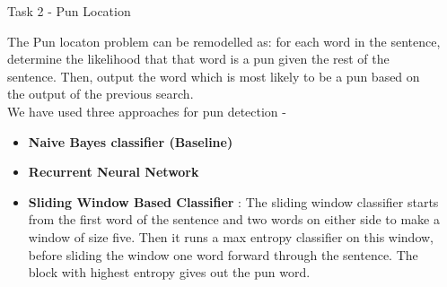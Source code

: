 \documentclass[final]{beamer}
\newlength{\onecolwid}
\newlength{\twocolwid}
\begin{document}
\begin{frame}[t]
\begin{columns}[t]
\begin{column}{\twocolwid}
\begin{columns}[t,totalwidth=\twocolwid] %

\begin{column}{\onecolwid} %


\begin{block}{Task 2 - Pun Location}
        {\large The Pun locaton problem can be remodelled as: for each word in the sentence, determine the likelihood that that word is a pun given the rest of the sentence. Then, output the word which is most likely to be a pun based on the output of the previous search. \\
        We have used three approaches for pun detection - 
        \begin{itemize}
          \item {\textbf{Naive Bayes classifier (Baseline)}}
           \item {\textbf{Recurrent Neural Network} %
           }
          \item {\textbf{Sliding Window Based Classifier} : The sliding window classifier starts from the first word of the sentence and two words on either side to make a window of size five. Then it runs a max entropy classifier on this window, before sliding the window one word forward through the sentence. The block with highest entropy gives out the pun word.}
          \end{itemize}
          \\
        }
      \end{block}
      

\end{column} %

\begin{column}{\onecolwid} %



\end{column}
\end{columns}
\end{column}
\end{columns}
\end{frame}
\end{document}
